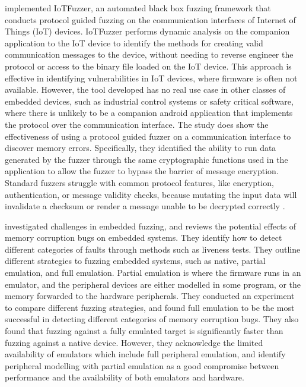 \documentclass[../report.tex]{subfiles}
\begin{document}
\citet{IOTFuzzer_2018} implemented IoTFuzzer, an automated black box fuzzing
framework that conducts protocol guided fuzzing on the communication interfaces
of Internet of Things (IoT) devices. IoTFuzzer performs dynamic analysis on the companion
application to the IoT device to identify the methods for creating valid
communication messages to the device, without needing to reverse engineer the
protocol or access to the binary file loaded on the IoT device. This approach
is effective in identifying vulnerabilities in IoT devices, where firmware is
often not available. However, the tool developed has no real use case in other
classes of embedded devices, such as industrial control systems or safety
critical software, where there is unlikely to be a companion android
application that implements the protocol over the communication interface.
The study does show the effectiveness of using a protocol guided
fuzzer on a communication interface to discover memory errors. Specifically,
they identified the ability to run data generated by the fuzzer through the same
cryptographic functions used in the application to allow the fuzzer to bypass
the barrier of message encryption. Standard fuzzers struggle with common
protocol features, like encryption, authentication, or message validity checks,
because mutating the input data will invalidate a checksum or render a message
unable to be decrypted correctly \citep{Fuzztruction_2023}.

\citet{Muench_2018} investigated challenges in embedded fuzzing, and reviews
the potential effects of memory corruption bugs on embedded systems.
They identify how to detect different categories of faults through methods such
as liveness tests. They outline different strategies to fuzzing embedded
systems, such as native, partial emulation, and full emulation. Partial
emulation is where the firmware runs in an emulator, and the peripheral devices
are either modelled in some program, or the memory forwarded to the hardware
peripherals. They conducted an experiment to compare different fuzzing
strategies, and found full emulation to be the most successful in detecting
different categories of memory corruption bugs. They also found that fuzzing
against a fully emulated target is significantly faster than fuzzing against a
native device. However, they acknowledge the limited availability of emulators
which include full peripheral emulation, and identify peripheral modelling with
partial emulation as a good compromise between performance and the availability
of both emulators and hardware.
\end{document}
